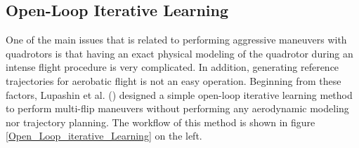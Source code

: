 \documentclass{thesisreport}
\begin{document}
\subsection{Open-Loop Iterative Learning}

One of the main issues that is related to performing aggressive maneuvers with quadrotors is that having an exact physical modeling of the quadrotor during an intense flight procedure is very complicated. In addition, generating reference trajectories for aerobatic flight is not an easy operation. Beginning from these factors, Lupashin et al. (\cite{Lupashin2010,Lupashin2011,Lupashin2012})
designed a simple open-loop iterative learning method to perform multi-flip maneuvers without performing any aerodynamic modeling nor trajectory planning. The workflow of this method is shown in figure \ref{Open_Loop_iterative_Learning} on the left.
\end{document}
